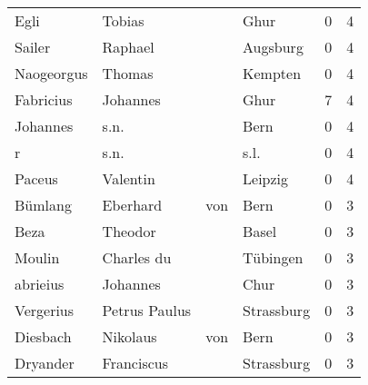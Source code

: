 \begin{tabular}{llllrr}
                     Egli &                             Tobias &             &                                        Ghur &          0 &         4 \\
                   Sailer &                            Raphael &             &                                    Augsburg &          0 &         4 \\
               Naogeorgus &                             Thomas &             &                                     Kempten &          0 &         4 \\
                Fabricius &                           Johannes &             &                                        Ghur &          7 &         4 \\
                 Johannes &                               s.n. &             &                                        Bern &          0 &         4 \\
                        r &                               s.n. &             &                                        s.l. &          0 &         4 \\
                   Paceus &                           Valentin &             &                                     Leipzig &          0 &         4 \\
                  Bümlang &                           Eberhard &         von &                                        Bern &          0 &         3 \\
                     Beza &                            Theodor &             &                                       Basel &          0 &         3 \\
                   Moulin &                         Charles du &             &                                    Tübingen &          0 &         3 \\
                 abrieius &                           Johannes &             &                                        Chur &          0 &         3 \\
                Vergerius &                      Petrus Paulus &             &                                  Strassburg &          0 &         3 \\
                 Diesbach &                           Nikolaus &         von &                                        Bern &          0 &         3 \\
                 Dryander &                         Franciscus &             &                                  Strassburg &          0 &         3 \\

\end{tabular}
